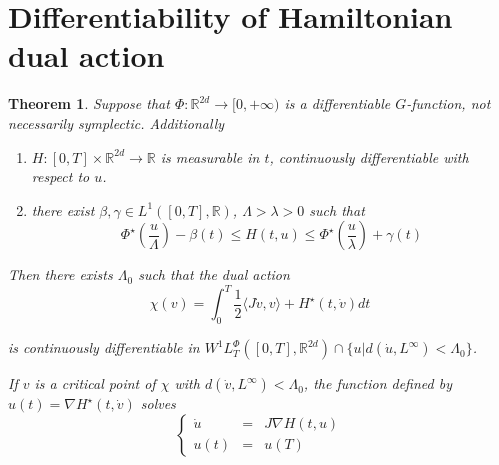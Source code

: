 \documentclass[twoside]{article}
\newtheorem{thm}{Theorem}[section]
\theoremstyle{remark}
\newcommand{\lphi}{L^{\Phi}}
\newcommand{\wphit}{W^{1}\lphi_T}
\newcommand{\rr}{\mathbb{R}}
\renewcommand{\leq}{\leqslant}
\begin{document}
\section{Differentiability of Hamiltonian dual action}

\begin{thm}\label{thm:DiffDualAct}
Suppose that $\Phi:\rr^{2d}\to [0,+\infty)$ is a differentiable $G$-function, not necessarily symplectic. Additionally
\begin{enumerate}
\item \label{it:h1-prop-H}
$H:[0,T]\times\rr^{2d}\to \rr$ is measurable in $t$, continuously differentiable with respect to $u$.
\item \label{it:h2-cotaH-conjphi}there exist $\beta, \gamma \in L^1([0,T],\rr)$, $\Lambda>\lambda>0$ such that
\begin{equation}\label{eq:cota-H-phi-conj}
\Phi^{\star}\left(\frac{u}{\Lambda}\right)-\beta(t)\leq H(t,u) \leq \Phi^{\star}\left(\frac{u}{\lambda}\right)+\gamma(t)
\end{equation}
\end{enumerate}
Then there exists $\Lambda_0$ such that the dual action
\begin{equation}\label{eq:DualAct}
 \chi(v)=\int_0^T \frac{1}{2} \langle J\dot{v},v\rangle+H^{\star}(t,\dot{v})  dt
\end{equation}



is continuously differentiable in $\wphit([0,T],\rr^{2d}) \cap \{u|d(\dot{u},L^{\infty})<\Lambda_0\}$.

If $v$ is a critical point of $\chi$ with $d(\dot{v},L^{\infty})<\Lambda_0$, the function defined by 
$u(t)=\nabla  H^{\star}(t,\dot{v})$
solves 
\[
\left\{\begin{array} {lll}
\dot{u}&=&J\nabla H (t,u)
\\
u(t)&=&u(T)
\end{array}
\right.
\]
\end{thm}
\end{document}
